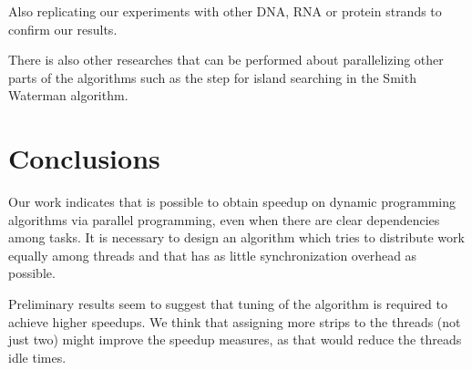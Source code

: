 \documentclass[journal]{IEEEtran}
\begin{document}
Also replicating our experiments with other DNA, RNA or protein strands to confirm our results. 

There is also other researches that can be performed about parallelizing other parts of the algorithms such as the step for island searching in the Smith Waterman algorithm.

\section{Conclusions}

Our work indicates that is possible to obtain speedup on dynamic programming algorithms via parallel programming, even when there are clear dependencies among tasks. It is necessary to design an algorithm which tries to distribute work equally among threads and that has as little synchronization overhead as possible.

Preliminary results seem to suggest that tuning of the algorithm is required to achieve higher speedups. We think that assigning more strips to the threads (not just two) might improve the speedup measures, as that would reduce the threads idle times. 





\ifCLASSOPTIONcaptionsoff
  \newpage
\fi

%
%
\end{document}
